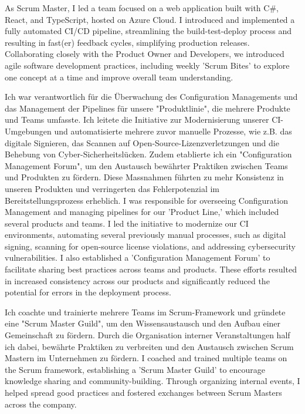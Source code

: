 \begin{cventries}
{\begin{cvitems}
{{				}
				{
					As Scrum Master, I led a team focused on a web application built with C\#, React, and TypeScript, hosted on Azure Cloud. I introduced and implemented a fully automated CI/CD pipeline, streamlining the build-test-deploy process and resulting in fast(er) feedback cycles, simplifying production releases. Collaborating closely with the Product Owner and Developers, we introduced agile software development practices, including weekly 'Scrum Bites' to explore one concept at a time and improve overall team understanding.
				}
			}			
			\item {
				{
					Ich war verantwortlich für die Überwachung des Configuration Managements und das Management der Pipelines für unsere "Produktlinie", die mehrere Produkte und Teams umfasste. Ich leitete die Initiative zur Modernisierung unserer CI-Umgebungen und automatisierte mehrere zuvor manuelle Prozesse, wie z.B. das digitale Signieren, das Scannen auf Open-Source-Lizenzverletzungen und die Behebung von Cyber-Sicherheitslücken. Zudem etablierte ich ein "Configuration Management Forum", um den Austausch bewährter Praktiken zwischen Teams und Produkten zu fördern. Diese Massnahmen führten zu mehr Konsistenz in unseren Produkten und verringerten das Fehlerpotenzial im Bereitstellungsprozess erheblich.
				}
				{
					I was responsible for overseeing Configuration Management and managing pipelines for our 'Product Line,' which included several products and teams. I led the initiative to modernize our CI environments, automating several previously manual processes, such as digital signing, scanning for open-source license violations, and addressing cybersecurity vulnerabilities. I also established a 'Configuration Management Forum' to facilitate sharing best practices across teams and products. These efforts resulted in increased consistency across our products and significantly reduced the potential for errors in the deployment process.
				}
			}
			\item {
				{
					Ich coachte und trainierte mehrere Teams im Scrum-Framework und gründete eine "Scrum Master Guild", um den Wissensaustausch und den Aufbau einer Gemeinschaft zu fördern. Durch die Organisation interner Veranstaltungen half ich dabei, bewährte Praktiken zu verbreiten und den Austausch zwischen Scrum Mastern im Unternehmen zu fördern.
				}
				{
					I coached and trained multiple teams on the Scrum framework, establishing a 'Scrum Master Guild' to encourage knowledge sharing and community-building. Through organizing internal events, I helped spread good practices and fostered exchanges between Scrum Masters across the company.
}}
\end{cvitems}}
\end{cventries}
